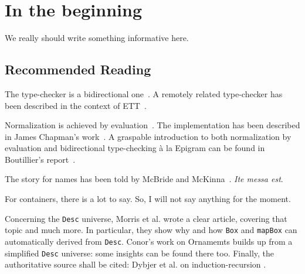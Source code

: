 \section{In the beginning}

We really should write something informative here.

\subsection{Recommended Reading}

The type-checker is a bidirectional
one~\cite{turner:bidirectional_tc}. A remotely related type-checker
has been described in the context of ETT~\cite{chapman:ett}.

Normalization is achieved by evaluation~\cite{dybjer:nbe,
  dybjer:dependent_types_work}. The implementation has been described
in James Chapman's work~\cite{chapman:phd}. A graspable introduction
to both normalization by evaluation and bidirectional type-checking
\`a la Epigram can be found in Boutillier's
report~\cite{boutillier:report}.

The story for names has been told by McBride and
McKinna~\cite{mcbride:free_variable}. \emph{Ite messa est}.

For containers, there is a lot to say. So, I will not say anything for
the moment.

Concerning the \verb|Desc| universe, Morris et al. \cite{morris:spf} wrote
a clear article, covering that topic and much more. In particular,
they show why and how \verb|Box| and \verb|mapBox| can automatically derived
from \verb|Desc|. Conor's work on Ornamemts \cite{mcbride:ornaments} builds
up from a simplified \verb|Desc| universe: some insights can be found there
too. Finally, the authoritative source shall be cited: Dybjer et
al. on induction-recursion \cite{dybjer:ir_axiom, dybjer:ir_algebra,
  dybjer:iir}.
